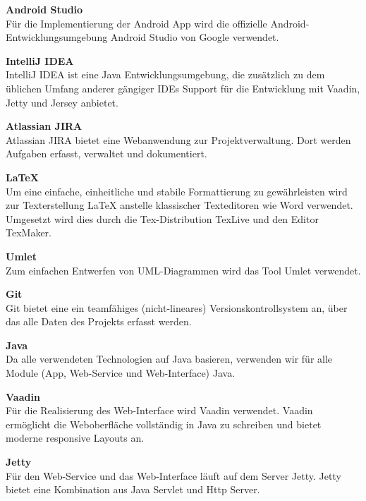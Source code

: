 \begin{description}
\item \textbf{Android Studio} \hfill \\
Für die Implementierung der Android App wird die offizielle Android-Entwicklungsumgebung Android Studio von Google verwendet.

\item \textbf{IntelliJ IDEA} \hfill \\
IntelliJ IDEA ist eine Java Entwicklungsumgebung, die zusätzlich zu dem üblichen Umfang anderer gängiger IDEs Support für die Entwicklung mit Vaadin, Jetty und Jersey anbietet.

\item \textbf{Atlassian JIRA} \hfill \\
Atlassian JIRA bietet eine Webanwendung zur Projektverwaltung. Dort werden Aufgaben erfasst, verwaltet und dokumentiert.

\item \textbf{LaTeX} \hfill \\
Um eine einfache, einheitliche und stabile Formattierung zu gewährleisten wird zur Texterstellung LaTeX  anstelle klassischer Texteditoren wie Word verwendet. Umgesetzt wird dies durch die Tex-Distribution TexLive und den Editor TexMaker.

\item \textbf{Umlet} \hfill \\
Zum einfachen Entwerfen von UML-Diagrammen wird das Tool Umlet verwendet.

\item \textbf{Git} \hfill \\
Git bietet eine ein teamfähiges (nicht-lineares) Versionskontrollsystem an, über das alle Daten des Projekts erfasst werden.

\item \textbf{Java} \hfill \\
Da alle verwendeten Technologien auf Java basieren, verwenden wir für alle Module (App, Web-Service und Web-Interface) Java.

\item \textbf{Vaadin} \hfill \\
Für die Realisierung des Web-Interface wird Vaadin verwendet. Vaadin ermöglicht die Weboberfläche vollständig in Java zu schreiben und bietet moderne responsive Layouts an.

\item \textbf{Jetty} \hfill \\
Für den Web-Service und das Web-Interface läuft auf dem Server Jetty. Jetty bietet eine Kombination aus Java Servlet und Http Server.


\end{description}
